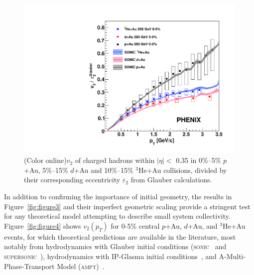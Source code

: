 \documentclass[%
reprint,
showpacs,preprintnumbers,
 amsmath,amssymb,
 aps,
]{revtex4-1}
\newcommand{\pt}{\mbox{$p_T$}\xspace}
\newcommand{\dau}{\mbox{$d$+Au}\xspace}
\newcommand{\pau}{\mbox{$p$+Au}\xspace}
\newcommand{\hau}{\mbox{$^3\text{He}$+Au}\xspace}
\begin{document}
\begin{figure}[htbp]
  \includegraphics[scale=0.45]{Figures/figure3_epsilon2ratio.pdf}
  \caption{(Color online)$v_2$ of charged hadrons within $|\eta| <$ 0.35 in 0\%--5\% \pau, 5\%--15\% \dau and 10\%--15\% \hau collisions, divided by their corresponding eccentricity $\varepsilon_2$ from Glauber calculations.}
\label{fig:figure3_epsilonratio}
\end{figure}

In addition to confirming the importance of initial geometry, the results in Figure~\ref{fig:figure3} and their imperfect geometric scaling provide a stringent test for any theoretical model attempting to describe small system collectivity. Figure~\ref{fig:figure4} shows $v_2(\pt)$ for 0-5\% central \pau, \dau, and \hau events, for which theoretical predictions are available in the literature, most notably from hydrodynamics with Glauber initial conditions (\textsc{sonic}~\cite{Habich:2014jna} and \textsc{supersonic}~\cite{Romatschke:2015gxa}), hydrodynamics with IP-Glasma initial conditions~\cite{Schenke:2014gaa}, and A-Multi-Phase-Transport Model (\textsc{ampt})~\cite{lin_multiphase_2005}.
\end{document}

